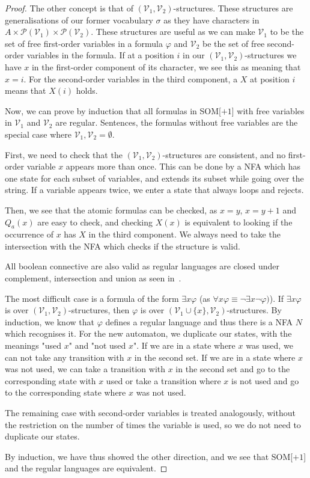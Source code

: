 \begin{proof}
    The other concept is that of $(\mathcal{V}_1, \mathcal{V}_2)$-structures.
    These structures are generalisations of our former vocabulary $\sigma$ as they have characters in $A \times \mathcal{P}(\mathcal{V}_1)\times \mathcal{P}(\mathcal{V}_2)$.
    These structures are useful as we can make $\mathcal{V}_1$ to be the set of free first-order variables in a formula $\varphi$ and $\mathcal{V}_2$ be the set of free second-order variables in the formula.
    If at a position $i$ in our $(\mathcal{V}_1, \mathcal{V}_2)$-structures we have $x$ in the first-order component of its character, we see this as meaning that $x = i$.
    For the second-order variables in the third component, a $X$ at position $i$ means that $X(i)$ holds.

    Now, we can prove by induction that all formulas in SOM[$+1$] with free variables in $\mathcal{V}_1$ and $\mathcal{V}_2$ are regular.
    Sentences, the formulas without free variables are the special case where $\mathcal{V}_1, \mathcal{V}_2 = \emptyset$.

    First, we need to check that the $(\mathcal{V}_1, \mathcal{V}_2)$-structures are consistent, and no first-order variable $x$ appears more than once.
    This can be done by a NFA which has one state for each subset of variables, and extends its subset while going over the string.
    If a variable appears twice, we enter a state that always loops and rejects.

    Then, we see that the atomic formulas can be checked, as $x = y$, $x = y + 1$ and $Q_a(x)$ are easy to check, and checking $X(x)$ is equivalent to looking if the occurrence of $x$ has $X$ in the third component.
    We always need to take the intersection with the NFA which checks if the structure is valid.

    All boolean connective are also valid as regular languages are closed under complement, intersection and union as seen in~\cite{theory-cs}.

    The most difficult case is a formula of the form $\exists x \varphi$ (as $\forall x \varphi \equiv \neg \exists x \neg \varphi)$).
    If $\exists x \varphi$ is over $(\mathcal{V}_1, \mathcal{V}_2)$-structures, then $\varphi$ is over $(\mathcal{V}_1 \cup \{x\}, \mathcal{V}_2)$-structures.
    By induction, we know that $\varphi$ defines a regular language and thus there is a NFA $N$ which recognises it.
    For the new automaton, we duplicate our states, with the meanings "used $x$" and "not used $x$".
    If we are in a state where $x$ was used, we can not take any transition with $x$ in the second set.
    If we are in a state where $x$ was not used, we can take a transition with $x$ in the second set and go to the corresponding state with $x$ used or take a transition where $x$ is not used and go to the corresponding state where $x$ was not used.

    The remaining case with second-order variables is treated analogously, without the restriction on the number of times the variable is used, so we do not need to duplicate our states.

    By induction, we have thus showed the other direction, and we see that SOM[$+ 1$] and the regular languages are equivalent.
\end{proof}

